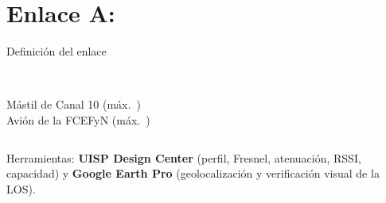 \renewcommand{\seccorta}{Enlace A}
\section{Enlace A: \EAnombre}

\begin{frame}{Definición del enlace}
  \begin{columns}[c]
    \centering
    \\
    {\scriptsize Mástil de Canal 10 (máx.\ \EAdosMax)}
    \centering
    \\
    {\scriptsize Avión de la FCEFyN (máx.\ \EAunoMax)}
  \end{columns}
  \vspace{6pt}
  \small Herramientas: \textbf{UISP Design Center} (perfil, Fresnel, atenuación, RSSI,
  capacidad) y \textbf{Google Earth Pro} (geolocalización y verificación visual de la LOS).
\end{frame}


